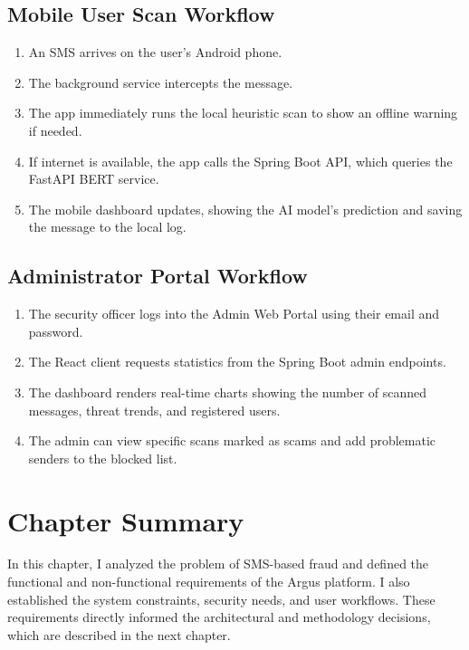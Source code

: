 \subsection{Mobile User Scan Workflow}
\begin{enumerate}
  \item An SMS arrives on the user's Android phone.
  \item The background service intercepts the message.
  \item The app immediately runs the local heuristic scan to show an offline warning if needed.
  \item If internet is available, the app calls the Spring Boot API, which queries the FastAPI BERT service.
  \item The mobile dashboard updates, showing the AI model's prediction and saving the message to the local log.
\end{enumerate}

\subsection{Administrator Portal Workflow}
\begin{enumerate}
  \item The security officer logs into the Admin Web Portal using their email and password.
  \item The React client requests statistics from the Spring Boot admin endpoints.
  \item The dashboard renders real-time charts showing the number of scanned messages, threat trends, and registered users.
  \item The admin can view specific scans marked as scams and add problematic senders to the blocked list.
\end{enumerate}

\section{Chapter Summary}
In this chapter, I analyzed the problem of SMS-based fraud and defined the functional and non-functional requirements of the Argus platform. I also established the system constraints, security needs, and user workflows. These requirements directly informed the architectural and methodology decisions, which are described in the next chapter.

